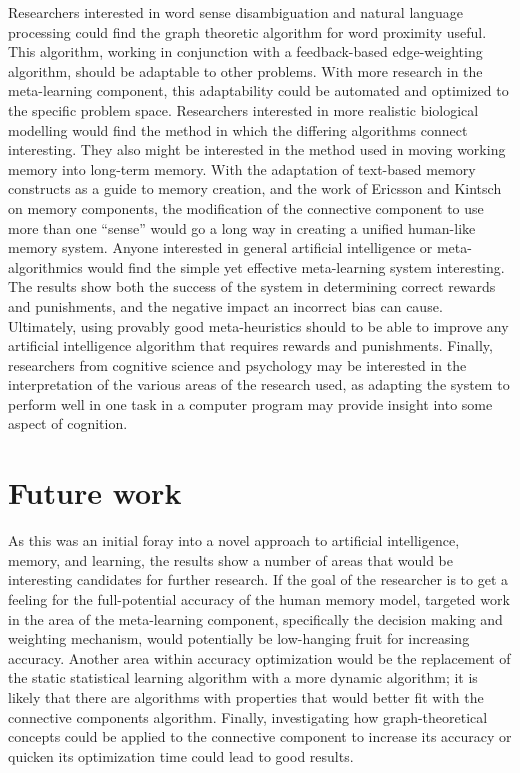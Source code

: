 Researchers interested in word sense disambiguation and natural language
processing could find the graph theoretic algorithm for word proximity useful.
This algorithm, working in conjunction with a feedback-based edge-weighting
algorithm, should be adaptable to other problems.  With more research in the
meta-learning component, this adaptability could be automated and optimized to
the specific problem space.  Researchers interested in more realistic biological
modelling would find the method in which the differing algorithms connect
interesting. They also might be interested in the method used in moving working
memory into long-term memory.  With the adaptation of text-based memory
constructs as a guide to memory creation, and the work of Ericsson and Kintsch
on memory components, the modification of the connective component to use more
than one ``sense'' would go a long way in creating a unified human-like memory
system.  Anyone interested in general artificial intelligence or meta-algorithmics 
would find the simple yet effective meta-learning system
interesting.  The results show both the success of the system in determining
correct rewards and punishments, and the negative impact an incorrect bias can
cause. Ultimately, using provably good meta-heuristics should to be able to
improve any artificial intelligence algorithm that requires rewards and
punishments.  Finally, researchers from cognitive science and psychology may be
interested in the interpretation of the various areas of the research used, as
adapting the system to perform well in one task in a computer program may
provide insight into some aspect of cognition.


\section{Future work}

As this was an initial foray into a novel approach to artificial intelligence,
memory, and learning, the results show a number of areas that would be
interesting candidates for further research.  If the goal of the researcher is
to get a feeling for the full-potential accuracy of the human memory model,
targeted work in the area of the meta-learning component, specifically the
decision making and weighting mechanism, would potentially be low-hanging fruit
for increasing accuracy.  Another area within accuracy optimization would be the
replacement of the static statistical learning algorithm with a more dynamic
algorithm; it is likely that there are algorithms with properties that would
better fit with the connective components algorithm. Finally, investigating how
graph-theoretical concepts could be applied to the connective component to
increase its accuracy or quicken its optimization time could lead to good
results.


